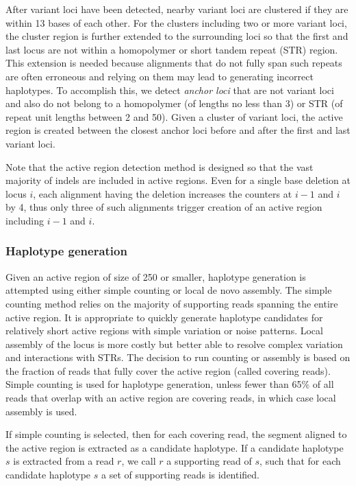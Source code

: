 \documentclass{article}
\begin{document}
After variant loci have been detected, nearby variant loci are clustered if they are within 13 bases of each other. For the clusters including two or more variant loci, the cluster region is further extended to the surrounding loci so that the first and last locus are not within a homopolymer or short tandem repeat (STR) region. This extension is needed because alignments that do not fully span such repeats are often erroneous and relying on them may lead to generating incorrect haplotypes. To accomplish this, we detect {\em anchor loci} that are not variant loci and also do not belong to a homopolymer (of lengths no less than 3) or STR (of repeat unit lengths between 2 and 50). Given a cluster of variant loci, the active region is created between the closest anchor loci before and after the first and last variant loci.

Note that the active region detection method is designed so that the vast majority of indels are included in active regions. Even for a single base deletion at locus $i$, each alignment having the deletion increases the counters at $i-1$ and $i$ by 4, thus only three of such alignments trigger creation of an active region including $i-1$ and $i$.


\subsubsection{Haplotype generation}
Given an active region of size of 250 or smaller, haplotype generation is attempted using either simple counting or local de novo assembly. The simple counting method relies on the majority of supporting reads spanning the entire active region. It is appropriate to quickly generate haplotype candidates for relatively short active regions with simple variation or noise patterns. Local assembly of the locus is more costly but better able to resolve complex variation and interactions with STRs. The decision to run counting or assembly is based on the fraction of reads that fully cover the active region (called covering reads). Simple counting is used for haplotype generation, unless fewer than 65\% of all reads that overlap with an active region are covering reads, in which case local assembly is used.

If simple counting is selected, then for each covering read, the segment aligned to the active region is extracted as a candidate haplotype. If a candidate haplotype $s$ is extracted from a read $r$, we call $r$ a supporting read of $s$, such that for each candidate haplotype $s$ a set of supporting reads is identified.
\end{document}

